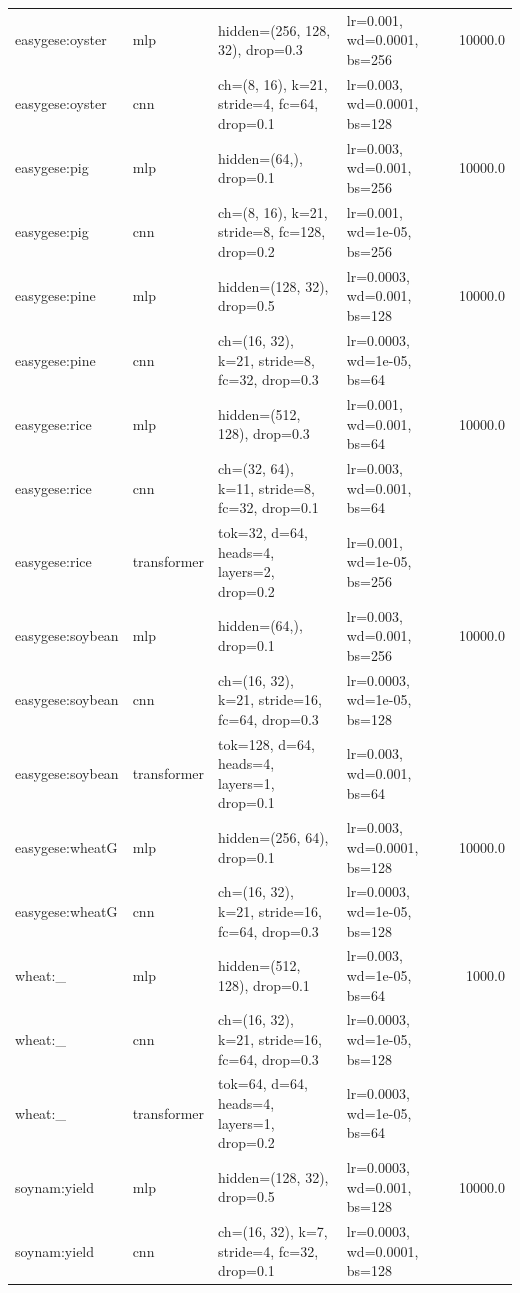 \begin{longtable}{llp{4.6cm}p{3.4cm}r}
easygese:oyster & mlp & hidden=(256, 128, 32), drop=0.3 & lr=0.001, wd=0.0001, bs=256 & 10000.0 \\
easygese:oyster & cnn & ch=(8, 16), k=21, stride=4, fc=64, drop=0.1 & lr=0.003, wd=0.0001, bs=128 &  \\
easygese:pig & mlp & hidden=(64,), drop=0.1 & lr=0.003, wd=0.001, bs=256 & 10000.0 \\
easygese:pig & cnn & ch=(8, 16), k=21, stride=8, fc=128, drop=0.2 & lr=0.001, wd=1e-05, bs=256 &  \\
easygese:pine & mlp & hidden=(128, 32), drop=0.5 & lr=0.0003, wd=0.001, bs=128 & 10000.0 \\
easygese:pine & cnn & ch=(16, 32), k=21, stride=8, fc=32, drop=0.3 & lr=0.0003, wd=1e-05, bs=64 &  \\
easygese:rice & mlp & hidden=(512, 128), drop=0.3 & lr=0.001, wd=0.001, bs=64 & 10000.0 \\
easygese:rice & cnn & ch=(32, 64), k=11, stride=8, fc=32, drop=0.1 & lr=0.003, wd=0.001, bs=64 &  \\
easygese:rice & transformer & tok=32, d=64, heads=4, layers=2, drop=0.2 & lr=0.001, wd=1e-05, bs=256 &  \\
easygese:soybean & mlp & hidden=(64,), drop=0.1 & lr=0.003, wd=0.001, bs=256 & 10000.0 \\
easygese:soybean & cnn & ch=(16, 32), k=21, stride=16, fc=64, drop=0.3 & lr=0.0003, wd=1e-05, bs=128 &  \\
easygese:soybean & transformer & tok=128, d=64, heads=4, layers=1, drop=0.1 & lr=0.003, wd=0.001, bs=64 &  \\
easygese:wheatG & mlp & hidden=(256, 64), drop=0.1 & lr=0.003, wd=0.0001, bs=128 & 10000.0 \\
easygese:wheatG & cnn & ch=(16, 32), k=21, stride=16, fc=64, drop=0.3 & lr=0.0003, wd=1e-05, bs=128 &  \\
wheat:\_ & mlp & hidden=(512, 128), drop=0.1 & lr=0.003, wd=1e-05, bs=64 & 1000.0 \\
wheat:\_ & cnn & ch=(16, 32), k=21, stride=16, fc=64, drop=0.3 & lr=0.0003, wd=1e-05, bs=128 &  \\
wheat:\_ & transformer & tok=64, d=64, heads=4, layers=1, drop=0.2 & lr=0.0003, wd=1e-05, bs=64 &  \\
soynam:yield & mlp & hidden=(128, 32), drop=0.5 & lr=0.0003, wd=0.001, bs=128 & 10000.0 \\
soynam:yield & cnn & ch=(16, 32), k=7, stride=4, fc=32, drop=0.1 & lr=0.0003, wd=0.0001, bs=128 &  \\

\end{longtable}
